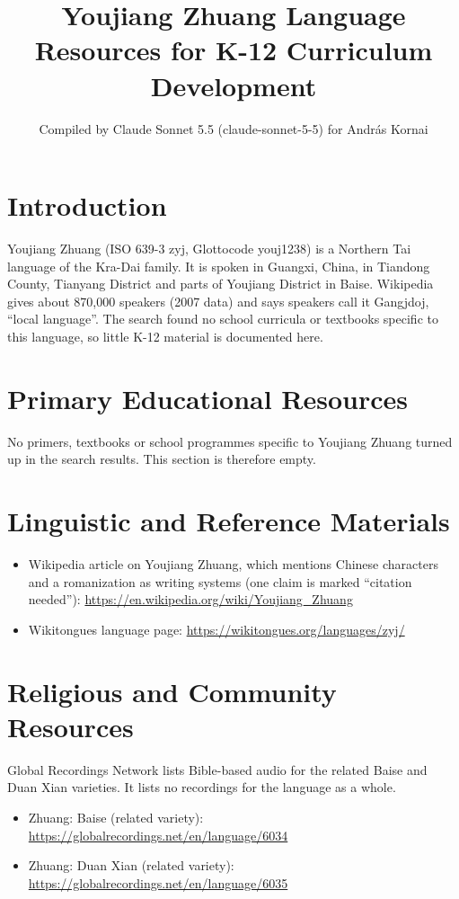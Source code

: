 \documentclass[12pt]{article}
\title{Youjiang Zhuang Language Resources for K-12 Curriculum Development}
\author{Compiled by Claude Sonnet 5.5 (claude-sonnet-5-5) for Andr\'as Kornai}
\date{}
\begin{document}
\maketitle

\section{Introduction}
Youjiang Zhuang (ISO 639-3 zyj, Glottocode youj1238) is a Northern Tai language of the Kra-Dai family. It is spoken in Guangxi, China, in Tiandong County, Tianyang District and parts of Youjiang District in Baise. Wikipedia gives about 870,000 speakers (2007 data) and says speakers call it Gangjdoj, ``local language''. The search found no school curricula or textbooks specific to this language, so little K-12 material is documented here.

\section{Primary Educational Resources}
No primers, textbooks or school programmes specific to Youjiang Zhuang turned up in the search results. This section is therefore empty.

\section{Linguistic and Reference Materials}
\begin{itemize}
\item Wikipedia article on Youjiang Zhuang, which mentions Chinese characters and a romanization as writing systems (one claim is marked ``citation needed''): \url{https://en.wikipedia.org/wiki/Youjiang_Zhuang}
\item Wikitongues language page: \url{https://wikitongues.org/languages/zyj/}
\end{itemize}

\section{Religious and Community Resources}
Global Recordings Network lists Bible-based audio for the related Baise and Duan Xian varieties. It lists no recordings for the language as a whole.
\begin{itemize}
\item Zhuang: Baise (related variety): \url{https://globalrecordings.net/en/language/6034}
\item Zhuang: Duan Xian (related variety): \url{https://globalrecordings.net/en/language/6035}
\end{itemize}
\end{document}
